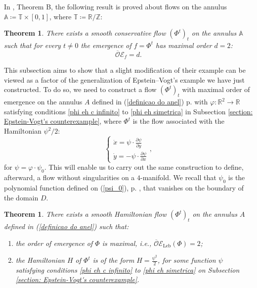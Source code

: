 \documentclass[11pt,reqno]{amsart}
\theoremstyle{plain}
\newtheorem{thm}[theorem]{Theorem}
\newtheorem{thmsn}[theorem]{Theorem}
\theoremstyle{definition}
\theoremstyle{remark}
\theoremstyle{plain}
\numberwithin{equation}{section}
\newcommand{\R}{\mathbb{R}}
\newcommand{\Z}{\mathbb{Z}}
\newcommand{\T}{\mathbb{T}}
\newcommand{\Leb}{\operatorname{Leb}}
\begin{document}
In \cite{bergerbochi}, Theorem B, the following result is proved about flows on the annulus $\mathbb{A}\coloneqq \T\times [0,1]$, where $\T\coloneqq \R/\Z$: 

\begin{thmsn}
	There exists a smooth conservative flow $\left(\Phi^{t}\right)_{t}$ on the annulus $\mathbb{A}$ such that for every $t\neq 0$ the emergence of $f=\Phi^{t}$ has maximal order $d=2$: $$\overline{\mathcal{O}}\mathcal{E}_{f}=d.$$
\end{thmsn}


This subsection aims to show that a slight modification of their example can be viewed as a factor of the generalization of Epstein--Vogt's example we have just constructed. To do so, we need to construct a flow $(\Phi^{t})_{t}$ with maximal order of emergence on the annulus $A$ defined in (\ref{definicao do anel}) p. \pageref{definicao do anel} with $\varphi\colon \R^{2} \to \R$ satisfying conditions \ref{phi eh c infinito} to \ref{phi eh simetrica} in Subsection \ref{section: Epstein-Vogt's counterexample}, where $\Phi^{t}$ is the flow associated with the Hamiltonian $\psi^{2}/2$: $$\begin{cases}
	\dot{x}=\psi\cdot \frac{\partial \psi}{\partial y}\\
	\dot{y}=-\psi\cdot \frac{\partial \psi}{\partial x}
\end{cases},$$ for $\psi=\varphi\cdot\psi_{0}$. This will enable us to carry out the same construction to define, afterward, a flow without singularities on a $4$-manifold. We recall that $\psi_{0}$ is the polynomial function defined on (\ref{psi_0}), p. \pageref{psi_0}, that vanishes on the boundary of the domain $D$.

\begin{thm}\label{teorema jairo pierre eh epstein vogt}
	There exists a smooth Hamiltonian
	flow $\left(\Phi^{t}\right)_{t}$ on the annulus $A$ defined in (\ref{definicao do anel}) such that: \begin{enumerate}[label=\((\alph*)\)]
		\item \label{Phi tem ordem de emergencia maximal} the order of emergence of $\Phi$ is maximal, i.e., $\overline{\mathcal{O}}\mathcal{E}_{\Leb}(\Phi)=2$;
		\item \label{H e hamiltoniano} the Hamiltonian $H$ of $\Phi^{t}$ is of the form $H=\frac{\psi^{2}}{2}$, for some function $\psi$ satisfying conditions \ref{phi eh c infinito} to \ref{phi eh simetrica} on Subsection \ref{section: Epstein-Vogt's counterexample}.
	\end{enumerate}     
\end{thm}
\end{document}
